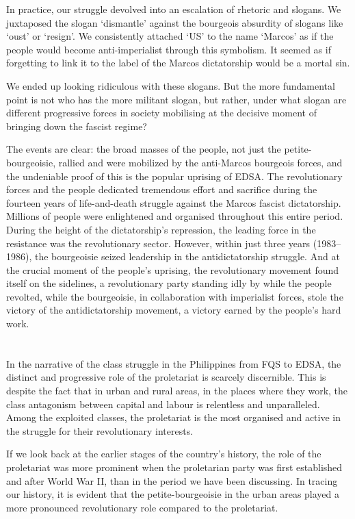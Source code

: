 In practice, our struggle devolved into an escalation of rhetoric and slogans. 
We juxtaposed the slogan `dismantle' 
against the bourgeois absurdity of slogans like `oust' or `resign'. 
We consistently attached `US' to the name `Marcos' 
as if the people would become anti-imperialist through this symbolism. 
It seemed as if forgetting to link it to the label of the Marcos dictatorship 
would be a mortal sin.

We ended up looking ridiculous with these slogans.
But the more fundamental point is not who has the more militant slogan, 
but rather, 
under what slogan are different progressive forces in society mobilising 
at the decisive moment of bringing down the fascist regime?

The events are clear: 
the broad masses of the people, 
not just the petite-bourgeoisie, 
rallied and were mobilized 
by the anti-Marcos bourgeois forces, 
and the undeniable proof of this 
is the popular uprising of EDSA. 
The revolutionary forces and the people 
dedicated tremendous effort and sacrifice 
during the fourteen years of life-and-death struggle 
against the Marcos fascist dictatorship. 
Millions of people were enlightened and organised 
throughout this entire period. 
During the height of the dictatorship's repression, 
the leading force in the resistance 
was the revolutionary sector. 
However, 
within just three years (1983--1986), 
the bourgeoisie seized leadership in the antidictatorship struggle. 
And at the crucial moment of the people's uprising, 
the revolutionary movement found itself on the sidelines, 
a revolutionary party standing idly by 
while the people revolted, 
while the bourgeoisie, 
in collaboration with imperialist forces, 
stole the victory of the antidictatorship movement, 
a victory earned by the people's hard work.


\section{}
In the narrative of the class struggle in the Philippines 
from FQS to EDSA, 
the distinct and progressive role of the proletariat 
is scarcely discernible. 
This is despite the fact that in urban and rural areas, 
in the places where they work, 
the class antagonism between capital and labour is relentless and unparalleled. 
Among the exploited classes,
the proletariat is the most organised and active 
in the struggle for their revolutionary interests.

If we look back at the earlier stages of the country's history,
the role of the proletariat was more prominent 
when the proletarian party was first established 
and after World War II,
than in the period we have been discussing. 
In tracing our history, 
it is evident that the petite-bourgeoisie in the urban areas 
played a more pronounced revolutionary role compared to the proletariat.

